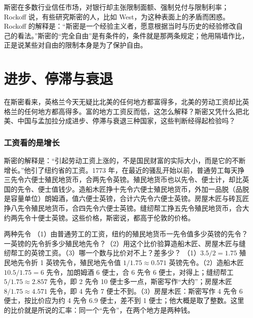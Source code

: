 \begin{pitfall}[斯密主张银行业完全放任]
斯密在多数行业信任市场，对银行却主张限制面额、强制兑付与限制利率；Rockoff 说，有些研究斯密的人，比如 West，为这种表面上的矛盾而困惑\cite{rockoff2009}。Rockoff 的解释是：“斯密是一个经验主义者，愿意根据当时与历史的经验修改自己的看法。”\cite{rockoff2009}斯密的“完全自由”是有条件的，条件就是那两条规定；他用隔墙作比，正是说某些对自由的限制本身是为了保护自由。
\end{pitfall}

\section{进步、停滞与衰退}\label{sec:smith-states}

在斯密看来，英格兰今天无疑比北美的任何地方都富得多，北美的劳动工资却比英格兰的任何地方都高得多\cite{smith1776}。富的地方工资反而低，这怎么解释？斯密又凭什么把北美、中国与孟加拉分成进步、停滞与衰退三种国家，这些判断经得起检验吗？

\subsubsection{工资看的是增长}
斯密的解释是：“引起劳动工资上涨的，不是国民财富的实际大小，而是它的不断增长。”\cite{smith1776}他引了纽约省的工资。1773 年，在最近的骚乱开始以前，普通劳工每天挣三先令六便士殖民地货币，合两先令英镑。殖民地货币也以先令、便士计，却比英国的先令、便士值钱少。造船木匠挣十先令六便士殖民地货币，外加一品脱（品脱是容量单位）朗姆酒，值六便士英镑，合计六先令六便士英镑。房屋木匠与砖瓦匠挣八先令殖民地货币，合四先令六便士英镑。缝纫帮工挣五先令殖民地货币，合大约两先令十便士英镑。这些价格，斯密说，都高于伦敦的价格\cite{smith1776}。

\begin{example}{两种先令}\label{ex:smith-wages}
（1）由普通劳工的工资，纽约的殖民地货币一先令值多少英镑的先令？一英镑的先令折多少殖民地先令？（2）用这个比价验算造船木匠、房屋木匠与缝纫帮工的英镑工资。（3）哪一个数与比价对不上？差多少？
\solution （1）$3.5/2=1.75$ 殖民地先令折 1 英镑先令，殖民地先令值 $1/1.75\approx0.571$ 英镑先令。（2）造船木匠 $10.5/1.75=6$ 先令，加朗姆酒 6 便士，合 6 先令 6 便士，对得上；缝纫帮工 $5/1.75\approx2.857$ 先令，即 2 先令 10 便士多一点，斯密写作“大约”；房屋木匠 $8/1.75\approx4.571$ 先令，即 4 先令 7 便士不到。（3）房屋木匠：斯密写作 4 先令 6 便士，按比价应为约 4 先令 6.9 便士，差不到 1 便士；他大概是取了整数。这里的比价就是所说的汇率：同一个“先令”，在两个地方是两种钱。
\end{example}

